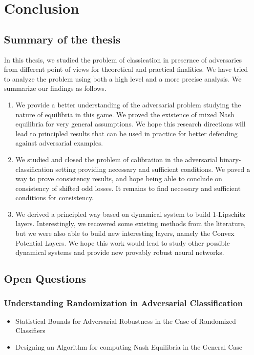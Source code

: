 \chapter{Conclusion}
\minitoc
\section{Summary of the thesis}

In this thesis, we studied the problem of  classication in presernce of adversaries from different point of views for theoretical and practical finalities. We have tried to analyze the problem using both a high level
and a more precise analysis. We summarize our findings as follows.

\begin{enumerate}
    \item We provide a better understanding of the adversarial problem studying the nature of equilibria in this game. We proved the existence of mixed Nash equilibria for very general assumptions. We hope this research directions will lead to principled results that can be used in practice for better defending against adversarial examples.
    \item We studied and closed the problem of calibration in the adversarial binary-classification setting providing necessary and sufficient conditions. We paved a way to prove consistency results, and hope being able to conclude on consistency of shifted odd losses. It remains to find necessary and sufficient conditions for consistency.
    \item We derived a principled way based on dynamical system to build $1$-Lipschitz layers. Interestingly, we recovered some existing methods from the literature, but we were also able to build new interesting layers, namely the Convex Potential Layers. We hope this work would lead to study other possible dynamical systems and provide new provably robust neural networks.
\end{enumerate}
\section{Open Questions}




\subsection{Understanding Randomization in Adversarial Classification}

\begin{itemize}
    \item Statistical Bounds for Adversarial Robustness in the Case of Randomized Classifiers
    \item Designing an Algorithm for computing Nash Equilibria in the General Case
\end{itemize}



